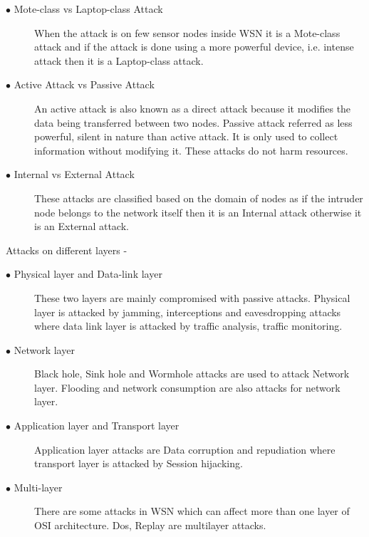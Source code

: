 \begin{description}
  \item[$\bullet$ Mote-class vs Laptop-class Attack]  When the attack is on few sensor nodes inside WSN it is a Mote-class attack and if the attack is done using a more powerful device, i.e. intense attack then it is a Laptop-class attack. 
  \item[$\bullet$ Active Attack vs Passive Attack] An active attack is also known as a direct attack because it modifies the data being transferred between two nodes. Passive attack referred as less powerful, silent in nature than active attack. It is only used to collect information without modifying it. These attacks do not harm resources.
  \item[$\bullet$ Internal vs External Attack] These attacks are classified based on the domain of nodes as if the intruder node belongs to the network itself then it is an Internal attack otherwise it is an External attack.
\end{description}

\noindent
Attacks on different layers \cite{lupu2009main}-
\begin{description}
  \item[$\bullet$ Physical layer and Data-link layer] These two layers are mainly compromised with passive attacks. Physical layer is attacked by jamming, interceptions and eavesdropping attacks where data link layer is attacked by traffic analysis, traffic monitoring.
  \item[$\bullet$ Network layer] Black hole, Sink hole and Wormhole attacks are used to attack Network layer. Flooding and network consumption are also attacks for network layer.
  \item[$\bullet$ Application layer and Transport layer] Application layer attacks are Data corruption and repudiation where transport layer is attacked by Session hijacking.
    \item[$\bullet$ Multi-layer] There are some attacks in WSN which can affect more than one layer of OSI architecture. Dos, Replay are multilayer attacks.
\end{description}

